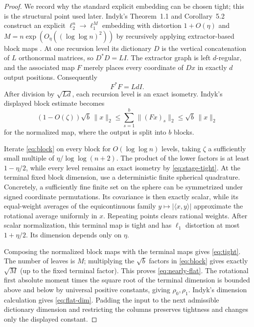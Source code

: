 \documentclass[11pt]{article}
\newcommand{\ip}[2]{\langle #1,#2\rangle}
\begin{document}
\begin{proof}
We record why the standard explicit embedding can be chosen tight; this is
the structural point used later.  Indyk's Theorem~1.1 and Corollary~5.2
construct an explicit $\ell_2^n\to\ell_1^M$ embedding with distortion
$1+O(\eta)$ and $M=n\exp(O_\eta((\log\log n)^2))$ by recursively applying
extractor-based block maps \cite{Indyk}.  At one recursion level its dictionary
$D$ is the vertical concatenation of $L$ orthonormal matrices, so
$D^*D=LI$.  The extractor graph is left $d$-regular, and the associated map
$F$ merely places every coordinate of $Dx$ in exactly $d$ output positions.
Consequently
\begin{equation}\label{eq:stage-tight}
 F^*F=LdI.
\end{equation}
After division by $\sqrt{Ld}$, each recursion level is an exact isometry.
Indyk's displayed block estimate becomes
\begin{equation}\label{eq:block}
 (1-O(\zeta))\sqrt b\,\|x\|_2
 \leq\sum_{s=1}^b\|(Fx)_s\|_2
 \leq\sqrt b\,\|x\|_2
\end{equation}
for the normalized map, where the output is split into $b$ blocks.

Iterate \eqref{eq:block} on every block for $O(\log\log n)$ levels, taking
$\zeta$ a sufficiently small multiple of $\eta/\log\log(n+2)$.  The product
of the lower factors is at least $1-\eta/2$, while every level remains an
exact isometry by \eqref{eq:stage-tight}.  At the terminal fixed block
dimension, use a deterministic finite spherical quadrature.  Concretely, a
sufficiently fine finite set on the sphere can be symmetrized under signed
coordinate permutations.  Its covariance is then exactly scalar, while its
equal-weight averages of the equicontinuous family
$y\mapsto|\ip{x}{y}|$ approximate the rotational average uniformly in
$x$.  Repeating points clears rational weights.  After scalar normalization,
this terminal map is tight and has $\ell_1$ distortion at most
$1+\eta/2$.  Its dimension depends only on $\eta$.

Composing the normalized block maps with the terminal maps gives
\eqref{eq:tight}.  The number of leaves is $M$; multiplying the $\sqrt b$
factors in \eqref{eq:block} gives exactly $\sqrt M$ (up to the fixed terminal
factor).  This proves \eqref{eq:nearly-flat}.  The rotational first absolute
moment times the square root of the terminal dimension is bounded above and
below by universal positive constants, giving $\rho_0,\rho_1$.  Indyk's
dimension calculation gives \eqref{eq:flat-dim}.  Padding the input to the
next admissible dictionary dimension and restricting the columns preserves
tightness and changes only the displayed constant.


\end{proof}
\end{document}
